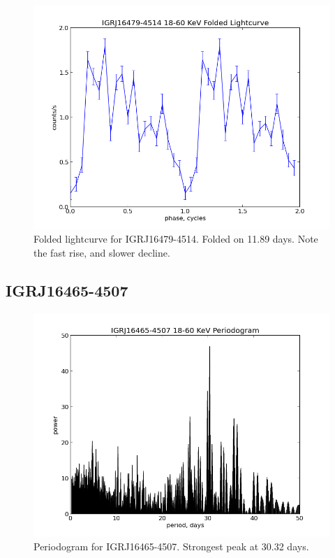 \begin{figure}[h!]
\centering
\includegraphics[width=130mm]{gfx/Fig19.png}
\caption{Folded lightcurve for IGRJ16479-4514. Folded on 11.89 days. Note the fast rise, and slower decline.}
\label{Figure 19}
\end{figure} 

\subsection{IGRJ16465-4507}

\begin{figure}[h!]
\centering
\includegraphics[width=130mm]{gfx/Figure20.png}
\caption{Periodogram for IGRJ16465-4507. Strongest peak at 30.32 days.}
\label{Figure 20}
\end{figure} 

